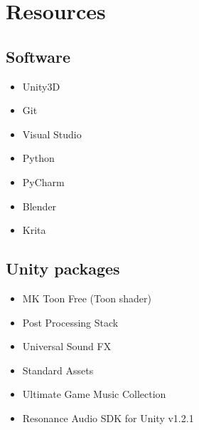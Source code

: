 \documentclass[a4paper, twoside, 10pt]{report}
\begin{document}
\chapter{Resources}
\section{Software}
\begin{itemize}
\item Unity3D
\item Git
\item Visual Studio
\item Python
\item PyCharm
\item Blender
\item Krita
\end{itemize}

\section{Unity packages}
\begin{itemize}
\item MK Toon Free (Toon shader) %
\item Post Processing Stack %
\item Universal Sound FX %
\item Standard Assets %
\item Ultimate Game Music Collection %
\item Resonance Audio SDK for Unity v1.2.1 %
\end{itemize}
\end{document}
